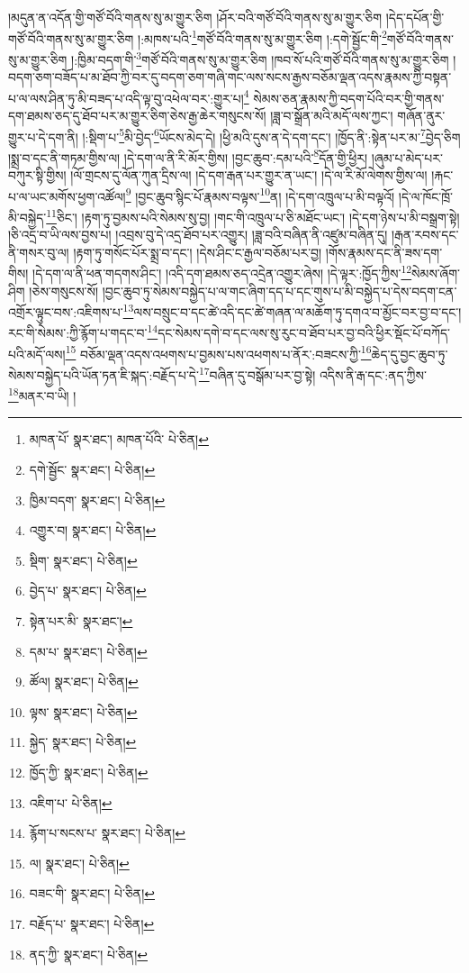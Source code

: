 །མདུན་ན་འདོན་གྱི་གཙོ་བོའི་གནས་སུ་མ་གྱུར་ཅིག །ཤོར་བའི་གཙོ་བོའི་གནས་སུ་མ་གྱུར་ཅིག །དེད་དཔོན་གྱི་གཙོ་བོའི་གནས་སུ་མ་གྱུར་ཅིག །:མཁས་པའི་\footnote{མཁན་པོ་  སྣར་ཐང་། མཁན་པོའི་  པེ་ཅིན། }གཙོ་བོའི་གནས་སུ་མ་གྱུར་ཅིག །:དགེ་སྦྱོང་གི་\footnote{དགེ་སྦྱོང་  སྣར་ཐང་།  པེ་ཅིན། }གཙོ་བོའི་གནས་སུ་མ་གྱུར་ཅིག །:ཁྱིམ་བདག་གི་\footnote{ཁྱིམ་བདག་  སྣར་ཐང་།  པེ་ཅིན། }གཙོ་བོའི་གནས་སུ་མ་གྱུར་ཅིག །ཁབ་སོ་པའི་གཙོ་བོའི་གནས་སུ་མ་གྱུར་ཅིག །བདག་ཅག་བཟོད་པ་མ་ཐོབ་ཀྱི་བར་དུ་བདག་ཅག་གཞི་གང་ལས་སངས་རྒྱས་བཅོམ་ལྡན་འདས་རྣམས་ཀྱི་བསྟན་པ་ལ་ལས་ཤིན་ཏུ་མི་བཟད་པ་འདི་ལྟ་བུ་འཕེལ་བར་:གྱུར་པ།\footnote{འགྱུར་བ།  སྣར་ཐང་།  པེ་ཅིན། } སེམས་ཅན་རྣམས་ཀྱི་བདག་པོའི་བར་གྱི་གནས་དག་ཐམས་ཅད་དུ་ཐོབ་པར་མ་གྱུར་ཅིག་ཅེས་རྒྱ་ཆེར་གསུངས་སོ། །ཟླ་བ་སྒྲོན་མའི་མདོ་ལས་ཀྱང་། གཞོན་ནུར་གྱུར་པ་དེ་དག་ནི། །:སྡིག་པ་\footnote{སྡིག་  སྣར་ཐང་།  པེ་ཅིན། }མི་བྱེད་\footnote{བྱེད་པ་  སྣར་ཐང་།  པེ་ཅིན། }ཡོངས་མེད་དེ། །ཕྱི་མའི་དུས་ན་དེ་དག་དང་། །ཁྱོད་ནི་:སྟེན་པར་མ་\footnote{སྟེན་པར་མི་  སྣར་ཐང་། }བྱེད་ཅིག །སྨྲ་བ་དང་ནི་གཏམ་གྱིས་ལ། །དེ་དག་ལ་ནི་རི་མོར་གྱིས། །བྱང་ཆུབ་:དམ་པའི་\footnote{དམ་པ་  སྣར་ཐང་།  པེ་ཅིན། }དོན་གྱི་ཕྱིར། །ཞུམ་པ་མེད་པར་བཀུར་སྟི་གྱིས། །ལོ་གྲངས་དུ་ལོན་ཀུན་དྲིས་ལ། །དེ་དག་རྒན་པར་གྱུར་ན་ཡང་། །དེ་ལ་རི་མོ་ལེགས་གྱིས་ལ། །རྐང་པ་ལ་ཡང་མགོས་ཕྱག་འཚོལ།\footnote{ཚོལ།  སྣར་ཐང་།  པེ་ཅིན། } །བྱང་ཆུབ་སྙིང་པོ་རྣམས་བལྟས་\footnote{ལྟས་  སྣར་ཐང་།  པེ་ཅིན། }ན། །དེ་དག་འཁྲུལ་པ་མི་བལྟའོ། །དེ་ལ་ཁོང་ཁྲོ་མི་བསྐྱེད་\footnote{སྐྱེད་  སྣར་ཐང་།  པེ་ཅིན། }ཅིང་། །རྟག་ཏུ་བྱམས་པའི་སེམས་སུ་བྱ། །གང་གི་འཁྲུལ་པ་ཅི་མཐོང་ཡང་། །དེ་དག་ཉེས་པ་མི་བསྒྲག་སྟེ། །ཅི་འདྲ་བ་ཡི་ལས་བྱས་པ། །འབྲས་བུ་དེ་འདྲ་ཐོབ་པར་འགྱུར། །ཟླ་བའི་བཞིན་ནི་འཛུམ་བཞིན་དུ། །རྒན་རབས་དང་ནི་གསར་བུ་ལ། །རྟག་ཏུ་གསོང་པོར་སྨྲ་བ་དང་། །དེས་ཤིང་ང་རྒྱལ་བཅོམ་པར་བྱ། །གོས་རྣམས་དང་ནི་ཟས་དག་གིས། །དེ་དག་ལ་ནི་ཕན་གདགས་ཤིང་། །འདི་དག་ཐམས་ཅད་འདྲེན་འགྱུར་ཞེས། །དེ་ལྟར་:ཁྱོད་ཀྱིས་\footnote{ཁྱོད་ཀྱི་  སྣར་ཐང་།  པེ་ཅིན། }སེམས་ཞོག་ཤིག །ཅེས་གསུངས་སོ། །བྱང་ཆུབ་ཏུ་སེམས་བསྐྱེད་པ་ལ་གང་ཞིག་དད་པ་དང་གུས་པ་མི་བསྐྱེད་པ་དེས་བདག་ངན་འགྲོར་ལྟུང་བས་:འཇིགས་པ་\footnote{འཇིག་པ་  པེ་ཅིན། }ལས་བསྲུང་བ་དང་ཚེ་འདི་དང་ཚེ་གཞན་ལ་མཆོག་ཏུ་དགའ་བ་མྱོང་བར་བྱ་བ་དང་། རང་གི་སེམས་:ཀྱི་རྙོག་པ་གདང་བ་\footnote{རྙོག་པ་སངས་པ་  སྣར་ཐང་།  པེ་ཅིན། }དང་སེམས་དགེ་བ་དང་ལས་སུ་རུང་བ་ཐོབ་པར་བྱ་བའི་ཕྱིར་སྡོང་པོ་བཀོད་པའི་མདོ་ལས།\footnote{ལ།  སྣར་ཐང་།  པེ་ཅིན། } བཅོམ་ལྡན་འདས་འཕགས་པ་བྱམས་པས་འཕགས་པ་ནོར་:བཟངས་ཀྱི་\footnote{བཟང་གི་  སྣར་ཐང་།  པེ་ཅིན། }ཆེད་དུ་བྱང་ཆུབ་ཏུ་སེམས་བསྐྱེད་པའི་ཡོན་ཏན་ཇི་སྐད་:བརྗོད་པ་དེ་\footnote{བརྗོད་པ་  སྣར་ཐང་།  པེ་ཅིན། }བཞིན་དུ་བསྒོམ་པར་བྱ་སྟེ། འདིས་ནི་རྒ་དང་:ནད་ཀྱིས་\footnote{ནད་ཀྱི་  སྣར་ཐང་།  པེ་ཅིན། }མནར་བ་ཡི། །
